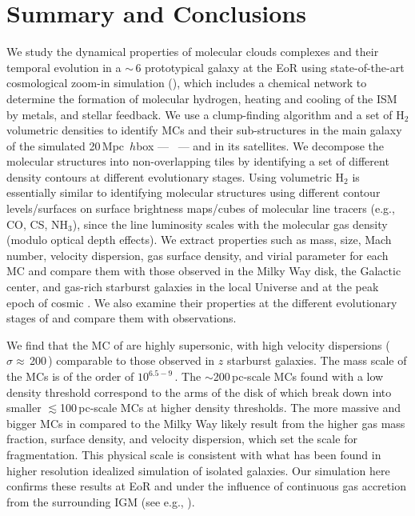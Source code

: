 \IfFileExists{emulateapjlegacy.cls}{\documentclass[iop]{emulateapjlegacy}}{\documentclass[iop]{emulateapj}}
\begin{document}
\section{Summary and Conclusions}      \label{sec:conclusion}

We study the dynamical properties of molecular clouds complexes and their temporal evolution in a \z$\sim$\,6 prototypical galaxy
at the EoR using state-of-the-art cosmological zoom-in simulation (),
which includes a chemical network to determine the formation of molecular
hydrogen, heating and cooling of the ISM by metals, and stellar feedback.
We use a clump-finding algorithm and a set of H$_2$ volumetric densities
to identify MCs and their sub-structures in the main galaxy of the
simulated 20\,Mpc~$h$\pmOne box --- \flower\ --- and in its satellites.
We decompose the molecular structures into non-overlapping tiles
by identifying a set of different density contours at different evolutionary stages.
Using volumetric H$_2$ is essentially similar to identifying molecular structures using
different contour levels/surfaces on surface brightness maps/cubes of molecular line tracers (e.g., CO, CS, NH$_3$),
since the line luminosity scales with the molecular gas density (modulo optical depth effects).
We extract properties such as mass, size, Mach number, velocity dispersion, gas surface density, and virial parameter for each MC and
compare them with those observed in the Milky Way disk, the Galactic center,
and gas-rich starburst galaxies in the local Universe and at the peak epoch of cosmic \SF.
We also examine their properties at the different evolutionary stages of \flower and compare
them with observations.

We find that the MC of \flower are highly supersonic, with high velocity dispersions ($\sigma\approx$\,200\,\kms) comparable to
those observed in $z$ starburst galaxies.
The mass scale of the MCs is of the order of $10^{6.5-9}$\,\Msun. The $\sim$200\,pc-scale MCs found with a low density threshold
correspond to the arms of the disk of \flower which break down into smaller $\lesssim$100\,pc-scale MCs at higher density thresholds.
The more massive and bigger MCs in \flower compared to the Milky Way
likely result from the higher gas mass fraction, surface density, and velocity dispersion,
which set the scale for fragmentation.
This physical scale is 
consistent with what has been found in higher resolution idealized simulation of isolated galaxies.
Our simulation here confirms these results at EoR and under
the influence of continuous gas accretion from the surrounding IGM (see e.g., \citealt{Klessen10a, Goldbaum11a}).
\end{document}
